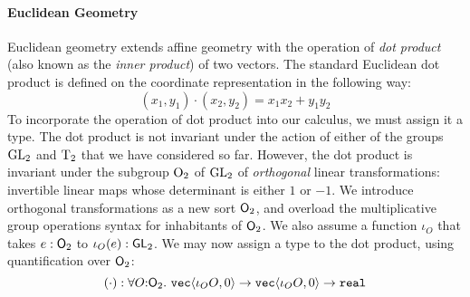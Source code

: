 \paragraph{Euclidean Geometry} Euclidean geometry extends affine
geometry with the operation of \emph{dot product} (also known as the
\emph{inner product}) of two vectors. The standard Euclidean dot
product is defined on the coordinate representation in the following
way:
\begin{displaymath}
  (x_1,y_1) \cdot (x_2,y_2) = x_1x_2 + y_1y_2
\end{displaymath}
To incorporate the operation of dot product into our calculus, we must
assign it a type. The dot product is not invariant under the action of
either of the groups $\mathrm{GL}_2$ and $\mathrm{T}_2$ that we have considered
so far. However, the dot product is invariant under the subgroup
$\mathrm{O}_2$ of $\mathrm{GL}_2$ of \emph{orthogonal} linear transformations:
invertible linear maps whose determinant is either $1$ or $-1$. We
introduce orthogonal transformations as a new sort $\mathsf{O}_2$, and
overload the multiplicative group operations syntax for inhabitants of
$\mathsf{O}_2$. We also assume a function $\iota_O$ that takes $e :
\mathsf{O}_2$ to $\iota_O(e) : \mathsf{GL}_2$. We may now assign a type to
the dot product, using quantification over $\mathsf{O}_2$:
\begin{displaymath}
  (\cdot) : \forall O \mathord: \SynOrth{2}.\ \tyPrim{vec}{\iota_OO, 0} \to \tyPrim{vec}{\iota_OO, 0} \to \tyPrimNm{real}
\end{displaymath}

